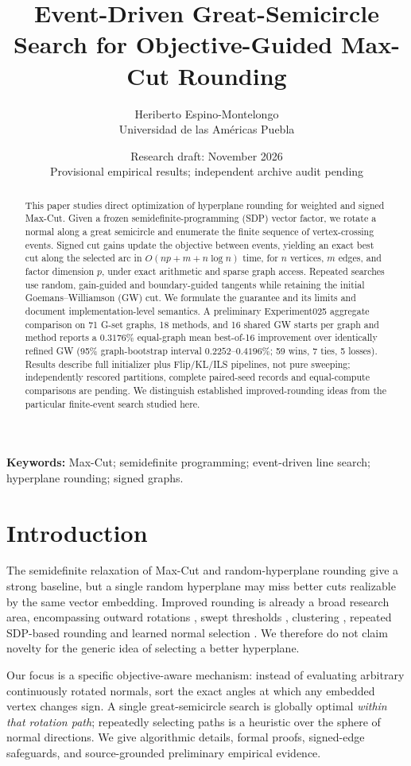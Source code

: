 \documentclass[10pt,letterpaper]{article}
\title{\bfseries Event-Driven Great-Semicircle Search for Objective-Guided Max-Cut Rounding}
\author{Heriberto Espino-Montelongo\\\small Universidad de las Am\'ericas Puebla}
\date{Research draft: November 2026\\\small Provisional empirical results; independent archive audit pending}
\begin{document}
\maketitle
\begin{abstract}
This paper studies direct optimization of hyperplane rounding for weighted and signed Max-Cut. Given a frozen semidefinite-programming (SDP) vector factor, we rotate a normal along a great semicircle and enumerate the finite sequence of vertex-crossing events. Signed cut gains update the objective between events, yielding an exact best cut along the selected arc in \(O(np+m+n\log n)\) time, for \(n\) vertices, \(m\) edges, and factor dimension \(p\), under exact arithmetic and sparse graph access. Repeated searches use random, gain-guided and boundary-guided tangents while retaining the initial Goemans--Williamson (GW) cut. We formulate the guarantee and its limits and document implementation-level semantics. A preliminary Experiment025 aggregate comparison on 71 G-set graphs, 18 methods, and 16 shared GW starts per graph and method reports a \(0.3176\%\) equal-graph mean best-of-16 improvement over identically refined GW (95\% graph-bootstrap interval \(0.2252\)--\(0.4196\%\); 59 wins, 7 ties, 5 losses). Results describe full initializer plus Flip/KL/ILS pipelines, not pure sweeping; independently rescored partitions, complete paired-seed records and equal-compute comparisons are pending. We distinguish established improved-rounding ideas from the particular finite-event search studied here.
\end{abstract}
\noindent\textbf{Keywords:} Max-Cut; semidefinite programming; event-driven line search; hyperplane rounding; signed graphs.

\section{Introduction}
The semidefinite relaxation of Max-Cut and random-hyperplane rounding \citep{goemans1995} give a strong baseline, but a single random hyperplane may miss better cuts realizable by the same vector embedding. Improved rounding is already a broad research area, encompassing outward rotations \citep{zwick1999,feige2006}, swept thresholds \citep{lang2004}, clustering \citep{rodriguez2020}, repeated SDP-based rounding \citep{felzenszwalb2022} and learned normal selection \citep{maliakal2025}. We therefore do not claim novelty for the generic idea of selecting a better hyperplane.

Our focus is a specific objective-aware mechanism: instead of evaluating arbitrary continuously rotated normals, sort the exact angles at which any embedded vertex changes sign. A single great-semicircle search is globally optimal \emph{within that rotation path}; repeatedly selecting paths is a heuristic over the sphere of normal directions. We give algorithmic details, formal proofs, signed-edge safeguards, and source-grounded preliminary empirical evidence.
\end{document}
